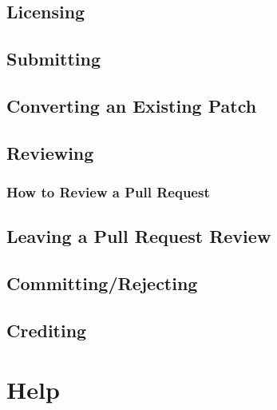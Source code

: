 \documentclass[]{book}
\begin{document}
\hypertarget{licensing-1}{%
\section{Licensing}\label{licensing-1}}

\hypertarget{submitting-1}{%
\section{Submitting}\label{submitting-1}}

\hypertarget{converting-an-existing-patch-1}{%
\section{Converting an Existing Patch}\label{converting-an-existing-patch-1}}

\hypertarget{reviewing-1}{%
\section{Reviewing}\label{reviewing-1}}

\hypertarget{how-to-review-a-pull-request-1}{%
\subsection{How to Review a Pull Request}\label{how-to-review-a-pull-request-1}}

\hypertarget{leaving-a-pull-request-review-1}{%
\section{Leaving a Pull Request Review}\label{leaving-a-pull-request-review-1}}

\hypertarget{committingrejecting-1}{%
\section{Committing/Rejecting}\label{committingrejecting-1}}

\hypertarget{crediting-1}{%
\section{Crediting}\label{crediting-1}}

\hypertarget{help}{%
\chapter{Help}\label{help}}
\end{document}
